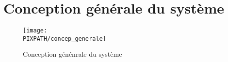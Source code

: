 
\section{Conception générale du système}

\begin{figure}
\begin{center}
    \texttt{[image: \\PIXPATH/concep\_generale]}
\end{center}
\caption{Conception génénrale du système}
\end{figure}
